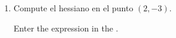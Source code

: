 \begin{enumerate}[leftmargin=*]
\begin{enumerate}
      \item Compute el hessiano en el punto $(2,-3)$.
            \begin{indication}
            Enter the expression  in the .
            \end{indication}
      \end{enumerate}



\end{enumerate}
